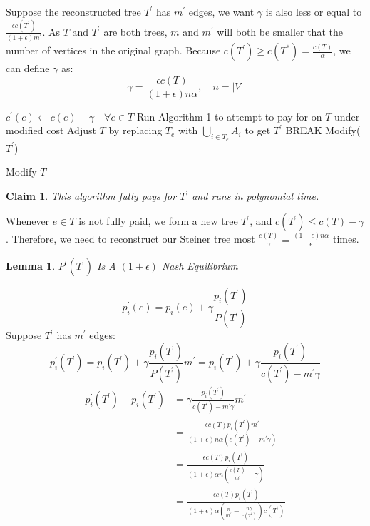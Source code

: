 \documentclass[11pt,psfig,times]{article}
\newtheorem{lemma}{Lemma}[section]
\newtheorem{claim}{Claim}
\begin{document}
	Suppose the reconstructed tree $T^{'}$ has $m^{'}$ edges, we want $\gamma$ is also less or equal to $\frac{\epsilon c(T^{'})}{(1+\epsilon)m^{'}}$. As $T \text{ and } T^{'}$ are both trees, $m \text{ and } m^{'}$ will both be smaller that the number of vertices in the original graph.  Because $c(T^{'}) \geq c(T^*) = \frac{c(T)}{\alpha}$, we can define $\gamma$ as:
	\[\gamma = \frac{\epsilon c(T)}{(1+\epsilon)n\alpha},\quad n = |V|\]
	
	
		\begin{algorithm}[H]
			\begin{algorithmic}[2]
				\STATE $c^{'}(e) \gets  c(e) -\gamma \quad \forall e \in T$
				\STATE Run Algorithm 1 to attempt to pay for on $T$ under modified cost
				\STATE  Adjust \( T\) by replacing \(T_e\) with  \(\bigcup_{i\in T_e} A_i\) to get \(T^{'}\)
				\STATE BREAK
				\ENDIF
				\ENDWHILE
				\STATE Modify($T^{'}$)
			   
			\end{algorithmic}
			\caption{Modify $T$ }
			\end{algorithm}
		
			\begin{claim}
				This algorithm fully pays for $T^{'}$ and  runs in polynomial time.
			\end{claim}
	
		
		Whenever \( e \in T \) is not fully paid, we form a new tree $T^{'}$, and $c(T^{'}) \leq c(T) - \gamma $. Therefore, we need to reconstruct our Steiner tree most  $\frac{c(T)}{\gamma} = \frac{(1+\epsilon)n\alpha }{\epsilon}$ times.
	
	
	
	\begin{lemma}
	$P^{'}(T^{'})$ Is A $(1+\epsilon)$ Nash Equilibrium
	\end{lemma}
		\[p_i^{'}(e) = p_i(e) + \gamma\frac{p_i(T^{'})}{P(T^{'})}\]
		Suppose $T^{'}$ has $m^{'}$ edges:
		\[p_i^{'}(T^{'}) = p_i(T^{'}) + \gamma\frac{p_i(T^{'})}{P(T^{'})}m^{'} = p_i(T^{'}) + \gamma\frac{p_i(T^{'})}{c(T^{'}) - m^{'}\gamma}\]
		\begin{align*}
		p_i^{'}(T^{'}) - p_i(T^{'}) &=  \gamma\frac{p_i(T^{'})}{c(T^{'}) - m^{'}\gamma}m^{'}\\  &= \frac{\epsilon c(T) p_i(T^{'}) m^{'} }{(1+\epsilon)n\alpha(c(T^{'}) - m^{'}\gamma)}  \\ &=  \frac{\epsilon c(T) p_i(T^{'})}{(1+\epsilon)\alpha n(\frac{c(T^{'})}{m^{'}} - \gamma)} \\ &=  \frac{\epsilon c(T) p_i(T^{'})}{(1+\epsilon)\alpha (\frac{n}{m^{'}} - \frac{n\gamma}{c(T^{'})})c(T^{'})}   
		\end{align*}
	
\end{document}
